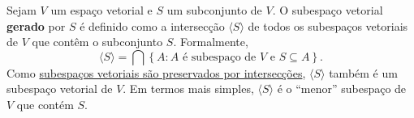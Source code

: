 \begin{definition}
	Sejam $V$ um espaço vetorial e $S$ um subconjunto de $V$. O subespaço vetorial \textbf{gerado} por $S$ é definido como a intersecção $\langle S\rangle$ de todos os subespaços vetoriais de $V$ que contêm o subconjunto $S$. Formalmente,
	\[\langle S\rangle=\bigcap\left\{A:A\text{ é subespaço de }V\text{ e }S\subseteq A\right\}.\]
	Como \href{http://mtm.ufsc.br/~cordeiro/ensino/mtm3112.algebra.linear/02.subesp/teo_interseccao_subespacos_moodle.html}{subespaços vetoriais são preservados por intersecções}, $\langle S\rangle$ também é um subespaço vetorial de $V$. Em termos mais simples, $\langle S\rangle$ é o ``menor'' subespaço de $V$ que contém $S$.
\end{definition}